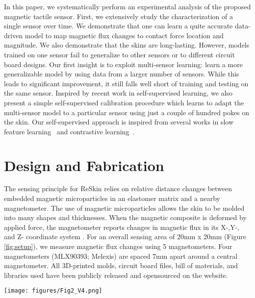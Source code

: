 \documentclass{article}
\begin{document}
In this paper, we systematically perform an experimental analysis of the proposed magnetic tactile sensor. First, we extensively study the characterization of a single sensor over time. We demonstrate that one can learn a quite accurate data-driven model to map magnetic flux changes to contact force location and magnitude. We also demonstrate that the skins are long-lasting. However, models trained on one sensor fail to generalize to other sensors or to different circuit board designs. Our first insight is to exploit multi-sensor learning: learn a more generalizable model by using data from a larger number of sensors. While this leads to significant improvement, it still falls well short of training and testing on the same sensor. Inspired by recent work in self-supervised learning, we also present a simple self-supervised calibration procedure which learns to adapt the multi-sensor model to a particular sensor using just a couple of hundred pokes on the skin. Our self-supervised approach is inspired from several works in slow feature learning~\cite{goroshin2015unsupervised, jayaraman2016slow} and contrastive learning~\cite{wang2015unsupervised, schroff2015facenet,chen2020simple}.

\vspace{-0.05in}
\section{Design and Fabrication} 
\vspace{-0.1in}
The sensing principle for ReSkin relies on relative distance changes between embedded magnetic microparticles in an elastomer matrix and a nearby magnetometer. The use of magnetic microparticles allows the skin to be molded into many shapes and thicknesses. When the magnetic composite is deformed by applied force, the magnetometer reports changes in magnetic flux in its X-,Y-, and Z- coordinate system \cite{hellebrekers2019soft}. For an overall sensing area of 20mm x 20mm (Figure \ref{fig:setup}), we measure magnetic flux changes using 5 magnetometers. Four magnetometers (MLX90393; Melexis) are spaced 7mm apart around a central magnetometer. All 3D-printed molds, circuit board files, bill of materials, and libraries used have been publicly released and opensourced on the website.

\begin{figure*}[t]
    \centering
    \texttt{[image: figures/Fig2\_V4.png]}
    \caption{A) Experimental setup for data collection with Dobot Magician, ATI Nano 17 (inset), and six sensor boards streaming to a control computer. B) Mold for curing elastomer along with magnet holders. C) Two types of circuit boards -- rigid and flexible -- designed to be used with ReSkin.}
    \label{fig:setup}
    \vspace{-0.2in}
\end{figure*}
\end{document}
